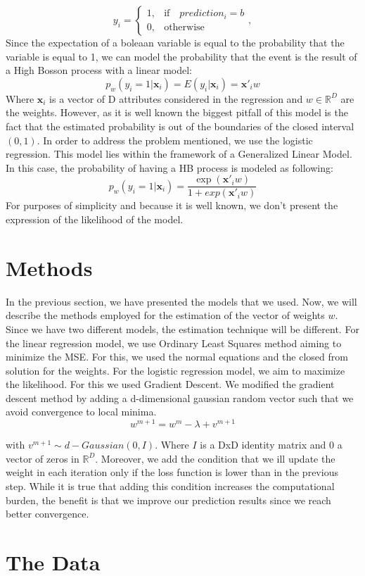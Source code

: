 \documentclass[10pt,conference,compsocconf]{IEEEtran}
\newcommand{\R}{\mathbb{R}}
\begin{document}
 $$
y_{i}=
\begin{cases}
1, & \text{if} \quad prediction_i=b\\
0, & \text{otherwise}
\end{cases}
, 
$$
Since the expectation of a boleaan variable is equal to the probability that the variable is equal to 1, we can model the probability that the event is the result of a High Bosson process with a linear model:
$$p_w(y_i=1|\textbf{x}_i)=E(y_i|\textbf{x}_i)=\textbf{x}'_i w$$
Where $\textbf{x}_i $ is a vector of D attributes considered in the regression and $w \in \R^D $ are the weights.
However, as it is well known the biggest pitfall of this model is the fact that the estimated probability is out of the boundaries of the closed interval $ ( 0,1 ) $. 
In order to address the problem mentioned, we use the logistic regression. This model lies within the framework of a Generalized Linear Model.  In this case, the probability of having a HB process is modeled as following:
$$p_w(y_i=1|\textbf{x}_i)=\frac{\exp(\textbf{x}'_i w)}{1+exp(\textbf{x}'_i w)}$$
For purposes of simplicity and because it is well known, we don't present the expression of the likelihood of the model.
\section{Methods}
In the previous section, we have presented the models that we used. Now, we will describe the methods employed for the estimation of the vector of weights $w$. Since we have two different models, the estimation technique will be different. 
For the linear regression model, we use Ordinary Least Squares method aiming to minimize the MSE. For this, we used the normal equations and the closed from solution for the weights. 
For the logistic regression model, we aim to maximize the likelihood. For this we used Gradient Descent. We modified the gradient descent method by adding a d-dimensional gaussian random vector such that we avoid convergence to local minima. 
$$w^{m+1}=w^{m}-\lambda +v^{m+1}$$

with $v^{m+1} \sim d-Gaussian(0,I)$. Where $I$ is a DxD identity matrix and 0 a vector of zeros in $\R^D$.
Moreover, we add the condition that we ill update the weight in each iteration only if the loss function is lower than in the previous step. While it is true that adding this condition increases the computational burden, the benefit is that we improve our prediction results since we reach better convergence.
\section{The Data}
\label{S1}
\end{document}
